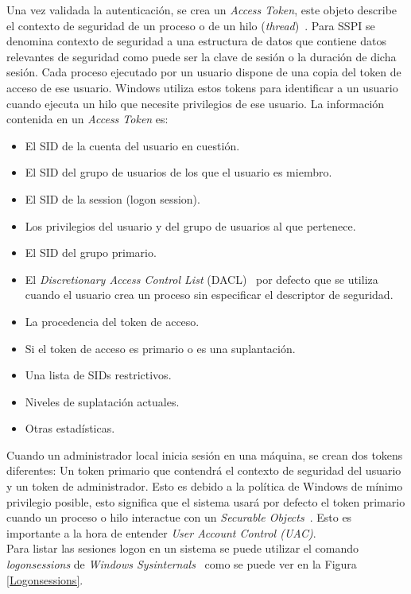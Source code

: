 Una vez validada la autenticación, se crea un {\it Access Token}, este objeto describe el contexto de seguridad de un proceso o de un hilo ({\it thread})~\cite{Capitulo2:Access-Token}. Para SSPI se denomina contexto de seguridad a una estructura de datos que contiene datos relevantes de seguridad como puede ser la clave de sesión o la duración de dicha sesión. Cada proceso ejecutado por un usuario dispone de una copia del token de acceso de ese usuario. Windows utiliza estos tokens para identificar a un usuario cuando ejecuta un hilo que necesite privilegios de ese usuario. La información contenida en un {\it Access Token} es:

\begin{itemize}
\item El SID de la cuenta del usuario en cuestión.
\item El SID del grupo de usuarios de los que el usuario es miembro.
\item El SID de la session (logon session).
\item Los privilegios del usuario y del grupo de usuarios al que pertenece.
\item El SID del grupo primario. 
\item El {\it Discretionary Access Control List} (DACL)~\cite{Capitulo2:DACL} por defecto que se utiliza cuando el usuario crea un proceso sin especificar el descriptor de seguridad.
\item La procedencia del token de acceso.
\item Si el token de acceso es primario o es una suplantación. 
\item Una lista de SIDs restrictivos.
\item Niveles de suplatación actuales.
\item Otras estadísticas. 
\end{itemize}

Cuando un administrador local inicia sesión en una máquina, se crean dos tokens diferentes: Un token primario que contendrá el contexto de seguridad del usuario y un token de administrador. Esto es debido a la política de Windows de mínimo privilegio posible, esto significa que el sistema usará por defecto el token primario cuando un proceso o hilo interactue con un {\it Securable Objects}~\cite{Capitulo2:Securable-Objects}. Esto es importante a la hora de entender {\it User Account Control (UAC)}.\\

Para listar las sesiones logon en un sistema se puede utilizar el comando {\it logonsessions} de {\it Windows Sysinternals}~\cite{Capitulo2:Sysinternals} como se puede ver en la Figura \ref{Logonsessions}.

